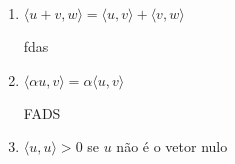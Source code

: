 \documentclass[12pt, twoside, a4]{article} %
\begin{document}
\begin{enumerate}
    \item $ \langle u + v, w \rangle =  \langle u, v \rangle + \langle v, w \rangle $
    
    fdas
    \item $\langle \alpha u, v \rangle = \alpha \langle u, v \rangle $
    
    FADS
    \item  $\langle u, u \rangle > 0 $ se $ u $ não é o vetor nulo
\end{enumerate}
\end{document}
